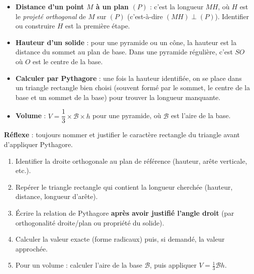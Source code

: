 \documentclass[11pt]{article}
\begin{document}
\begin{aretenir}
\begin{itemize}
\item \textbf{Distance d'un point $M$ à un plan $(P)$} : c'est la longueur $MH$, où $H$ est le \emph{projeté orthogonal} de $M$ sur $(P)$ (c'est-à-dire $(MH) \perp (P)$). Identifier ou construire $H$ est la première étape.
\item \textbf{Hauteur d'un solide} : pour une pyramide ou un cône, la hauteur est la distance du sommet au plan de base. Dans une pyramide régulière, c'est $SO$ où $O$ est le centre de la base.
\item \textbf{Calculer par Pythagore} : une fois la hauteur identifiée, on se place dans un triangle rectangle bien choisi (souvent formé par le sommet, le centre de la base et un sommet de la base) pour trouver la longueur manquante.
\item \textbf{Volume} : $V = \dfrac{1}{3} \times \mathcal{B} \times h$ pour une pyramide, où $\mathcal{B}$ est l'aire de la base.
\end{itemize}
\textbf{Réflexe} : toujours nommer et justifier le caractère rectangle du triangle avant d'appliquer Pythagore.
\end{aretenir}

\begin{methode}
\begin{enumerate}
\item Identifier la droite orthogonale au plan de référence (hauteur, arête verticale, etc.).
\item Repérer le triangle rectangle qui contient la longueur cherchée (hauteur, distance, longueur d'arête).
\item Écrire la relation de Pythagore \textbf{après avoir justifié l'angle droit} (par orthogonalité droite/plan ou propriété du solide).
\item Calculer la valeur exacte (forme radicaux) puis, si demandé, la valeur approchée.
\item Pour un volume : calculer l'aire de la base $\mathcal{B}$, puis appliquer $V = \frac{1}{3}\mathcal{B}h$.
\end{enumerate}
\end{methode}
\end{document}
